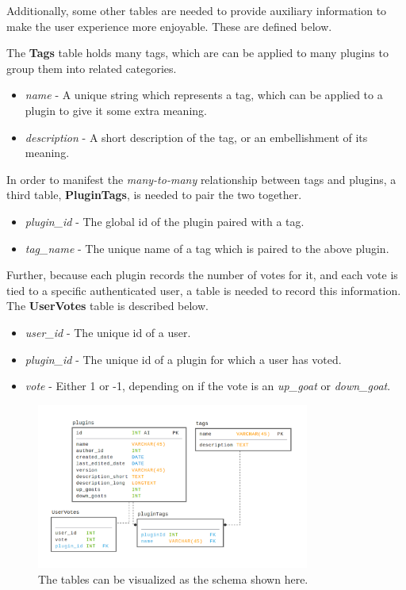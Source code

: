 \documentclass[a4paper, 12pt]{article}
\begin{document}
		Additionally, some other tables are needed to provide auxiliary information to make the user experience more enjoyable. These are defined below.

		The \textbf{Tags} table holds many tags, which are can be applied to many plugins to group them into related categories.

		\begin{itemize}
			\item \emph{name} - A unique string which represents a tag, which can be applied to a plugin to give it some extra meaning.
			\item \emph{description} - A short description of the tag, or an embellishment of its meaning.
		\end{itemize}

		In order to manifest the \emph{many-to-many} relationship between tags and plugins, a third table, \textbf{PluginTags}, is needed to pair the two together.

		\begin{itemize}
			\item \emph{plugin\_id} - The global id of the plugin paired with a tag.
			\item \emph{tag\_name} - The unique name of a tag which is paired to the above plugin.
		\end{itemize}

		Further, because each plugin records the number of votes for it, and each vote is tied to a specific authenticated user, a table is needed to record this information. The \textbf{UserVotes} table is described below.

		\begin{itemize}
			\item \emph{user\_id} - The unique id of a user.
			\item \emph{plugin\_id} - The unique id of a plugin for which a user has voted.
			\item \emph{vote} - Either 1 or -1, depending on if the vote is an \emph{up\_goat} or \emph{down\_goat}.
		\end{itemize}

		\begin{figure}
			\caption{The tables can be visualized as the schema shown here.}
			\centering
			\includegraphics[width=0.8\textwidth]{img/database_schema.png}
		\end{figure}
\end{document}
